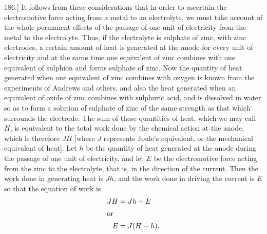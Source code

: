 \documentclass[12pt,oneside]{book}[2021/10/04]
\newcommand{\article}[1]{\phantomsection \label{art:#1}{#1.]}}
\newcommand{\¬}{\hphantom{0}}
\begin{document}
\article{186} It follows from these considerations that in order to ascertain
the electromotive force acting from a metal to an electrolyte,
we must take account of the whole permanent effects of the passage
of one unit of electricity from the metal to the electrolyte. Thus,
if the electrolyte is sulphate of zinc, with zinc electrodes, a certain
amount of heat is generated at the anode for every unit of electricity
and at the same time one equivalent of zinc combines with
one equivalent of sulphion and forms sulphate of zinc. Now the
quantity of heat generated when one equivalent of zinc combines
with oxygen is known from the experiments of Andrews and others,
and also the heat generated when an equivalent of oxide of zinc
combines with sulphuric acid, and is dissolved in water so as to
form a solution of sulphate of zinc of the same strength as that
which surrounds the electrode. The sum of these quantities of
heat, which we may call \(H\), is equivalent to the total work done by
the chemical action at the anode, which is therefore \(JH\) [where
\(J\) represents Joule's equivalent, or the mechanical equivalent of
heat]. Let \(h\) be the quantity of heat generated at the anode during
the passage of one unit of electricity, and let \(E\) be the electromotive
force acting from the zinc to the electrolyte, that is, in the direction
of the current. Then the work done in generating heat is \(Jh\), and
the work done in driving the current is \(E\) so that the equation of
work is
\begin{align*}
JH &= Jh + E \\
\shortintertext{or}
E &= J(H - h)\text{.}
\end{align*}
\end{document}
